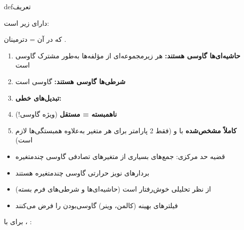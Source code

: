 \begin{PSbox}[unbreakable]{def}{تعریف}

 دارای  زیر است:


که در آن \lr{$\lvert \Sigma\rvert$} = دترمینان \lr{$\Sigma$}.

\end{PSbox}


\begin{enumerate}
\def\labelenumi{\arabic{enumi}.}
\tightlist
\item
  \textbf{حاشیه‌ای‌ها گاوسی هستند:} هر زیرمجموعه‌ای از مؤلفه‌ها به‌طور مشترک گاوسی است
\item
  \textbf{شرطی‌ها گاوسی هستند:}  گاوسی است
\item
  \textbf{تبدیل‌های خطی:} 
\item
  \textbf{ناهمبسته = مستقل} (ویژه گاوسی!)
\item
  \textbf{کاملاً مشخص‌شده} با \lr{$\mu$} و \lr{$\Sigma$} (فقط 2 پارامتر برای هر متغیر به‌علاوه همبستگی‌ها لازم است)
\end{enumerate}


\begin{itemize}
\tightlist
\item
  قضیه حد مرکزی: جمع‌های بسیاری از متغیرهای تصادفی \lr{\mbox{\ensuremath{\to}}} گاوسی چندمتغیره
\item
  بردارهای نویز حرارتی گاوسی چندمتغیره هستند
\item
  از نظر تحلیلی خوش‌رفتار است (حاشیه‌ای‌ها و شرطی‌های فرم بسته)
\item
  فیلترهای بهینه (کالمن، وینر) گاوسی‌بودن را فرض می‌کنند
\end{itemize}


برای  با ، :


